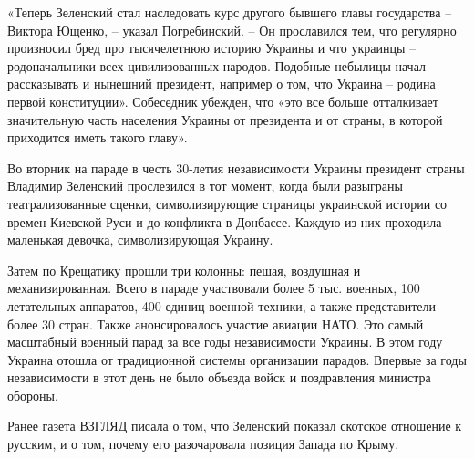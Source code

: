 «Теперь Зеленский стал наследовать курс другого бывшего главы государства –
Виктора Ющенко, – указал Погребинский. – Он прославился тем, что регулярно
произносил бред про тысячелетнюю историю Украины и что украинцы –
родоначальники всех цивилизованных народов. Подобные небылицы начал
рассказывать и нынешний президент, например о том, что Украина – родина первой
конституции». Собеседник убежден, что «это все больше отталкивает значительную
часть населения Украины от президента и от страны, в которой приходится иметь
такого главу».

Во вторник на параде в честь 30-летия независимости Украины президент страны
Владимир Зеленский прослезился в тот момент, когда были разыграны
театрализованные сценки, символизирующие страницы украинской истории со времен
Киевской Руси и до конфликта в Донбассе. Каждую из них проходила маленькая
девочка, символизирующая Украину.

Затем по Крещатику прошли три колонны: пешая, воздушная и механизированная.
Всего в параде участвовали более 5 тыс. военных, 100 летательных аппаратов, 400
единиц военной техники, а также представители более 30 стран. Также
анонсировалось участие авиации НАТО. Это самый масштабный военный парад за все
годы независимости Украины. В этом году Украина отошла от традиционной системы
организации парадов. Впервые за годы независимости в этот день не было объезда
войск и поздравления министра обороны.

Ранее газета ВЗГЛЯД писала о том, что Зеленский показал скотское отношение к
русским, и о том, почему его разочаровала позиция Запада по Крыму.

